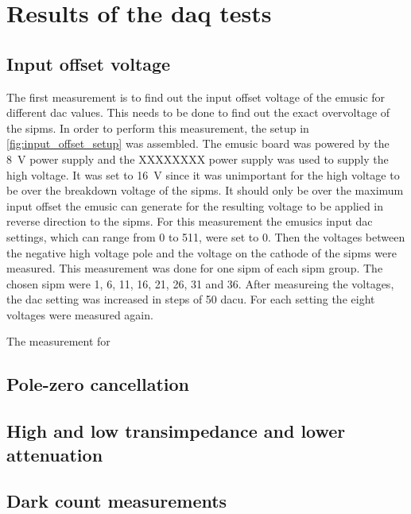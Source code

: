 \chapter{Results of the \ac{daq} tests}


\section{Input offset voltage}
The first measurement is to find out the input offset voltage of the \ac{emusic} for different \ac{dac} values.
This needs to be done to find out the exact overvoltage of the \acp{sipm}.
In order to perform this measurement, the setup in \autoref{fig:input_offset_setup} was assembled.
The \ac{emusic} board was powered by the \SI{8}{\volt} power supply and the XXXXXXXX power supply was used to supply the high voltage.
It was set to \SI{16}{\volt} since it was unimportant for the high voltage to be over the breakdown voltage of the \acp{sipm}.
It should only be over the maximum input offset the \ac{emusic} can generate for the resulting voltage to be applied in reverse direction to the \acp{sipm}.
For this measurement the \ac{emusic}s input \ac{dac} settings, which can range from 0 to 511, were set to 0.
Then the voltages between the negative high voltage pole and the voltage on the cathode of the \acp{sipm} were measured.
This measurement was done for one \ac{sipm} of each \ac{sipm} group.
The chosen \ac{sipm} were 1, 6, 11, 16, 21, 26, 31 and 36.
After measureing the voltages, the \ac{dac} setting was increased in steps of 50 \ac{dac}u.
For each setting the eight voltages were measured again.

The measurement for 

\section{Pole-zero cancellation}
\section{High and low transimpedance and lower attenuation}
\section{Dark count measurements}

